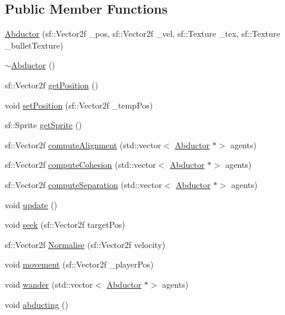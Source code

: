 \subsection*{Public Member Functions}
\begin{DoxyCompactItemize}
\item 
\hyperlink{class_abductor_a2b772afe64f564d1616f2513dfdb7d3e}{Abductor} (sf\+::\+Vector2f \+\_\+pos, sf\+::\+Vector2f \+\_\+vel, sf\+::\+Texture \+\_\+tex, sf\+::\+Texture \+\_\+bullet\+Texture)
\item 
\hyperlink{class_abductor_adc657b211a1b36c55db079caa10d9010}{$\sim$\+Abductor} ()
\item 
sf\+::\+Vector2f \hyperlink{class_abductor_a05b0a89323473488328dafa939e7252a}{get\+Position} ()
\item 
void \hyperlink{class_abductor_a8120f5a1284a3269345b213dc1074d17}{set\+Position} (sf\+::\+Vector2f \+\_\+temp\+Pos)
\item 
sf\+::\+Sprite \hyperlink{class_abductor_a604e41fd9403b542c83859027e8c67d4}{get\+Sprite} ()
\item 
sf\+::\+Vector2f \hyperlink{class_abductor_a1a22ca1f62b22a3e6ab183c0d07215c9}{compute\+Alignment} (std\+::vector$<$ \hyperlink{class_abductor}{Abductor} $\ast$$>$ agents)
\item 
sf\+::\+Vector2f \hyperlink{class_abductor_a8aa45d9b7d770533a60eae180c08d96f}{compute\+Cohesion} (std\+::vector$<$ \hyperlink{class_abductor}{Abductor} $\ast$$>$ agents)
\item 
sf\+::\+Vector2f \hyperlink{class_abductor_ac72ef77b379beff56efed7f66442c649}{compute\+Separation} (std\+::vector$<$ \hyperlink{class_abductor}{Abductor} $\ast$$>$ agents)
\item 
void \hyperlink{class_abductor_a1e3842b4fc70f8667b0e30f23bbce579}{update} ()
\item 
void \hyperlink{class_abductor_a6562333549ea4d8ef5d389e0594de7c1}{seek} (sf\+::\+Vector2f target\+Pos)
\item 
sf\+::\+Vector2f \hyperlink{class_abductor_a98f8c01f0131c30842121b0916fe89b2}{Normalise} (sf\+::\+Vector2f velocity)
\item 
void \hyperlink{class_abductor_a378997aa8cccf0b840f9ef8ba2970699}{movement} (sf\+::\+Vector2f \+\_\+player\+Pos)
\item 
void \hyperlink{class_abductor_a10a4ded56dcad749b1a1656688d135ea}{wander} (std\+::vector$<$ \hyperlink{class_abductor}{Abductor} $\ast$$>$ agents)
\item 
void \hyperlink{class_abductor_aa790b94b30a6bee13c26ffa4b093af6a}{abducting} ()

\end{DoxyCompactItemize}
